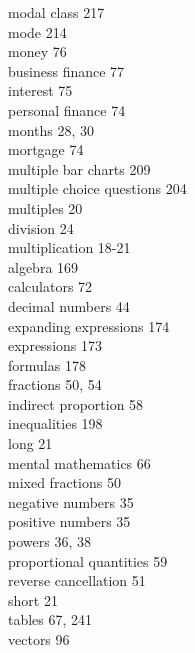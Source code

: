 \documentclass[10pt]{article}
\begin{document}
modal class 217\\
mode 214\\
money 76\\
business finance 77\\
interest 75\\
personal finance 74\\
months 28, 30\\
mortgage 74\\
multiple bar charts 209\\
multiple choice questions 204\\
multiples 20\\
division 24\\
multiplication 18-21\\
algebra 169\\
calculators 72\\
decimal numbers 44\\
expanding expressions 174\\
expressions 173\\
formulas 178\\
fractions 50, 54\\
indirect proportion 58\\
inequalities 198\\
long 21\\
mental mathematics 66\\
mixed fractions 50\\
negative numbers 35\\
positive numbers 35\\
powers 36, 38\\
proportional quantities 59\\
reverse cancellation 51\\
short 21\\
tables 67, 241\\
vectors 96
\end{document}
